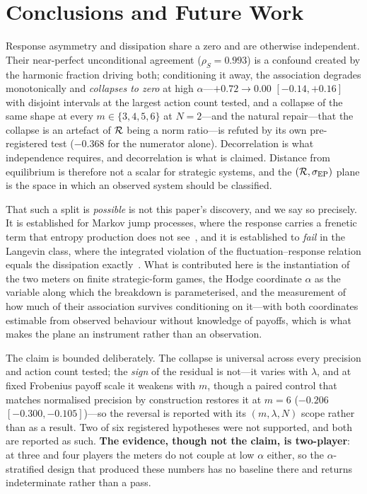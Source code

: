 \section{Conclusions and Future Work}
\label{sec:conclusions}

Response asymmetry and dissipation share a zero and are otherwise independent. Their
near-perfect unconditional agreement ($\rho_S=0.993$) is a confound created by the harmonic
fraction driving both; conditioning it away, the association degrades monotonically and
\emph{collapses to zero} at high $\alpha$---$+0.72\to0.00$ $[-0.14,+0.16]$ with disjoint
intervals at the largest action count tested, and a collapse of the same shape at every
$m\in\{3,4,5,6\}$ at $N=2$---and the natural repair---that the collapse is an artefact of
$\mathcal{R}$ being a norm ratio---is refuted by its own pre-registered test ($-0.368$ for the
numerator alone). Decorrelation is what independence requires, and decorrelation is what is
claimed. Distance from equilibrium is therefore not a scalar for strategic systems, and the
$(\mathcal{R},\sigma_{\mathrm{EP}})$ plane is the space in which an observed system should be classified.

That such a split is \emph{possible} is not this paper's discovery, and we say so precisely.
It is established for Markov jump processes, where the response carries a frenetic term that
entropy production does not see~\cite{baiesi2009}, and it is established to \emph{fail} in
the Langevin class, where the integrated violation of the fluctuation--response relation
equals the dissipation exactly~\cite{haradasasa2005}. What is contributed here is the
instantiation of the two meters on finite strategic-form games, the Hodge coordinate $\alpha$
as the variable along which the breakdown is parameterised, and the measurement of how much
of their association survives conditioning on it---with both coordinates estimable from
observed behaviour without knowledge of payoffs, which is what makes the plane an instrument
rather than an observation.

The claim is bounded deliberately. The collapse is universal across every precision and
action count tested; the \emph{sign} of the residual is not---it varies with $\lambda$, and
at fixed Frobenius payoff scale it weakens with $m$, though a paired control that matches
normalised precision by construction restores it at $m=6$ ($-0.206$ $[-0.300,-0.105]$)---so
the reversal is reported with its $(m,\lambda,N)$ scope rather than as a result. Two of six
registered hypotheses were not supported, and both are reported as such. \textbf{The
evidence, though not the claim, is two-player}: at three and four players the meters do not
couple at low $\alpha$ either, so the $\alpha$-stratified design that produced these numbers
has no baseline there and returns indeterminate rather than a pass.


